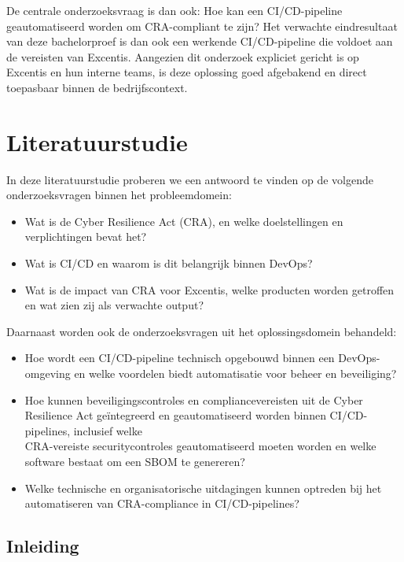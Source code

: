 De centrale onderzoeksvraag is dan ook: Hoe kan een CI/CD-pipeline geautomatiseerd worden om CRA-compliant te zijn? Het verwachte eindresultaat van deze bachelorproef is dan ook een werkende CI/CD-pipeline die voldoet aan de vereisten van Excentis. Aangezien dit onderzoek expliciet gericht is op Excentis en hun interne teams, is deze oplossing goed afgebakend en direct toepasbaar binnen de bedrijfscontext.



\section{Literatuurstudie}%
\label{sec:literatuurstudie}

In deze literatuurstudie proberen we een antwoord te vinden op de volgende onderzoeksvragen binnen het probleemdomein:
\begin{itemize}
  \item Wat is de Cyber Resilience Act (CRA), en welke doelstellingen en verplichtingen bevat het?
  \item Wat is CI/CD en waarom is dit belangrijk binnen DevOps?
  \item Wat is de impact van CRA voor Excentis, welke producten worden getroffen en wat zien zij als verwachte output?
\end{itemize}


Daarnaast worden ook de onderzoeksvragen uit het oplossingsdomein behandeld:
\begin{itemize}
  \item Hoe wordt een CI/CD-pipeline technisch opgebouwd binnen een DevOps-omgeving en welke voordelen biedt automatisatie voor beheer en beveiliging?
  \item Hoe kunnen beveiligingscontroles en compliancevereisten uit de Cyber Resilience Act geïntegreerd en geautomatiseerd worden binnen CI/CD-pipelines, inclusief welke\\CRA-vereiste securitycontroles geautomatiseerd moeten worden en welke software bestaat om een SBOM te genereren?
  \item Welke technische en organisatorische uitdagingen kunnen optreden bij het automatiseren van CRA-compliance in CI/CD-pipelines?
\end{itemize}

\subsection{Inleiding}

